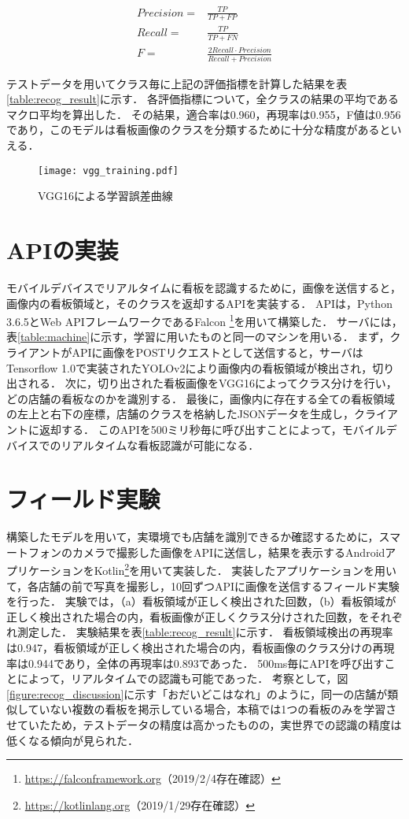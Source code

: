     \begin{align}
      Precision = &\frac{TP}{TP+FP} \\
      Recall = &\frac{TP}{TP+FN} \\
      F = &\frac{2 Recall \cdot Precision}{Recall + Precision}
    \end{align}
    
    テストデータを用いてクラス毎に上記の評価指標を計算した結果を表\ref{table:recog_result}に示す．
    各評価指標について，全クラスの結果の平均であるマクロ平均を算出した．
    その結果，適合率は0.960，再現率は0.955，F値は0.956であり，このモデルは看板画像のクラスを分類するために十分な精度があるといえる．

    \begin{figure}[tb]
      \centerline{\texttt{[image: vgg\_training.pdf]}}
      \caption{VGG16による学習誤差曲線}
      \label{figure:vgg_training}
    \end{figure}

\section{APIの実装}
  モバイルデバイスでリアルタイムに看板を認識するために，画像を送信すると，画像内の看板領域と，そのクラスを返却するAPIを実装する．
  APIは，Python 3.6.5とWeb APIフレームワークであるFalcon \footnote{\url{https://falconframework.org}（2019/2/4存在確認）}を用いて構築した．
  サーバには，表\ref{table:machine}に示す，学習に用いたものと同一のマシンを用いる．
  まず，クライアントがAPIに画像をPOSTリクエストとして送信すると，サーバはTensorflow 1.0\cite{Abadi:2016}で実装されたYOLOv2により画像内の看板領域が検出され，切り出される．
  次に，切り出された看板画像をVGG16によってクラス分けを行い，どの店舗の看板なのかを識別する．
  最後に，画像内に存在する全ての看板領域の左上と右下の座標，店舗のクラスを格納したJSONデータを生成し，クライアントに返却する．
  このAPIを500ミリ秒毎に呼び出すことによって，モバイルデバイスでのリアルタイムな看板認識が可能になる．

\section{フィールド実験}
  構築したモデルを用いて，実環境でも店舗を識別できるか確認するために，スマートフォンのカメラで撮影した画像をAPIに送信し，結果を表示するAndroidアプリケーションをKotlin\footnote{\url{https://kotlinlang.org}（2019/1/29存在確認）}を用いて実装した．
  実装したアプリケーションを用いて，各店舗の前で写真を撮影し，10回ずつAPIに画像を送信するフィールド実験を行った．
  実験では，（a）看板領域が正しく検出された回数，（b）看板領域が正しく検出された場合の内，看板画像が正しくクラス分けされた回数，をそれぞれ測定した．
  実験結果を表\ref{table:recog_result}に示す．
  看板領域検出の再現率は0.947，看板領域が正しく検出された場合の内，看板画像のクラス分けの再現率は0.944であり，全体の再現率は0.893であった．
  500ms毎にAPIを呼び出すことによって，リアルタイムでの認識も可能であった．
  考察として，図\ref{figure:recog_discussion}に示す「おだいどこはなれ」のように，同一の店舗が類似していない複数の看板を掲示している場合，本稿では1つの看板のみを学習させていたため，テストデータの精度は高かったものの，実世界での認識の精度は低くなる傾向が見られた．


